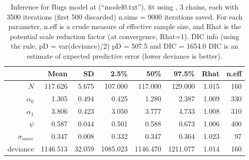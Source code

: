 \begin{table}[ht]
\caption{Inference for Bugs model at (``model0.txt''), fit using \jags, 3 chains,
each with 3500 iterations (first 500 discarded) n.sims = 9000 iterations saved.
For each parameter, n.eff is a crude measure of effective sample size,
and Rhat is the potential scale reduction factor (at convergence, Rhat=1).
DIC info (using the rule, pD = var(deviance)/2)
pD = 507.5 and DIC = 1654.0
DIC is an estimate of expected predictive error (lower deviance is better).
}
\begin{tabular}{rrrrrrrr} \hline \hline
                & Mean     & SD     & 2.5\%    & 50\%     & 97.5\%   & Rhat  & n.eff \\ \hline
$N$             & 117.626  & 5.675  & 107.000  & 117.000  & 129.000  & 1.015 & 160   \\
$\alpha_0$      & 1.305    & 0.494  & 0.425    & 1.280    & 2.387    & 1.009 & 330   \\
$\alpha_1$      & 3.806    & 0.423  & 3.050    & 3.777    & 4.733    & 1.008 & 310   \\
$\psi$          & 0.587    & 0.044  & 0.501    & 0.588    & 0.673    & 1.006 & 400   \\
$\sigma_{move}$ & 0.347    & 0.008  & 0.332    & 0.347    & 0.364    & 1.023 & 97    \\
deviance        & 1146.513 & 32.059 & 1085.023 & 1146.470 & 1211.077 & 1.014 & 160   \\ \hline
\end{tabular}
\label{searchencounter.tab.simtable}
\end{table}


